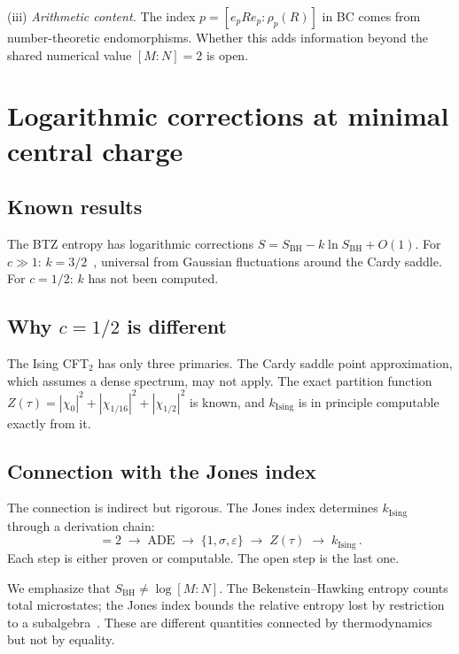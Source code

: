 \documentclass[aps,prl,twocolumn,superscriptaddress,showpacs]{revtex4-2}
\begin{document}
(iii) \textit{Arithmetic content.} The index $p = [e_p R e_p : \rho_p(R)]$ in BC comes from number-theoretic endomorphisms. Whether this adds information beyond the shared numerical value $[M{:}N]=2$ is open.

\section{Logarithmic corrections at minimal central charge}
\label{sec:logcorr}

\subsection{Known results}

The BTZ entropy has logarithmic corrections $S = S_{\mathrm{BH}} - k \ln S_{\mathrm{BH}} + O(1)$. For $c \gg 1$: $k = 3/2$~\cite{Carlip2000}, universal from Gaussian fluctuations around the Cardy saddle. For $c = 1/2$: $k$ has not been computed.

\subsection{Why $c=1/2$ is different}

The Ising CFT$_2$ has only three primaries. The Cardy saddle point approximation, which assumes a dense spectrum, may not apply. The exact partition function $Z(\tau) = |\chi_0|^2 + |\chi_{1/16}|^2 + |\chi_{1/2}|^2$ is known, and $k_{\mathrm{Ising}}$ is in principle computable exactly from it.

\subsection{Connection with the Jones index}

The connection is indirect but rigorous. The Jones index determines $k_{\mathrm{Ising}}$ through a derivation chain:
\begin{equation}
[M{:}N] = 2 \;\to\; \text{ADE} \;\to\; \{1,\sigma,\varepsilon\} \;\to\; Z(\tau) \;\to\; k_{\mathrm{Ising}}\,.
\end{equation}
Each step is either proven or computable. The open step is the last one.

We emphasize that $S_{\mathrm{BH}} \neq \log[M{:}N]$. The Bekenstein--Hawking entropy counts total microstates; the Jones index bounds the relative entropy lost by restriction to a subalgebra~\cite{LongoXu2018}. These are different quantities connected by thermodynamics but not by equality.
\end{document}
